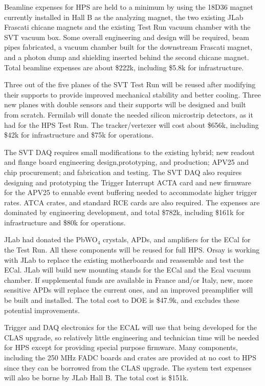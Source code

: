 Beamline expenses for HPS are held to a minimum by using the 18D36 magnet currently installed in Hall B as the analyzing magnet, the 
two existing JLab Frascati chicane magnets and the existing Test Run vacuum chamber with the SVT vacuum box.  Some overall engineering and design will be 
required, beam pipes fabricated, a vacuum chamber built for the downstream 
Frascati magnet, and a photon dump and shielding inserted behind the second chicane magnet. Total beamline expenses are about \$222k, including \$5.8k for infrastructure.

Three out of the five planes of the SVT Test Run will be reused after modifying their supports to provide improved 
mechanical stability and better cooling. Three new planes with double sensors and their supports will be designed and built from 
scratch. Fermilab will donate the needed silicon microstrip detectors, as it had for the HPS Test Run. The tracker/vertexer  will cost about \$656k, including \$42k for 
infrastructure and \$75k for operations.

The SVT DAQ requires small modifications to the  existing hybrid; new readout and flange board engineering design,prototyping, and 
production; 
APV25 and chip procurement; and  fabrication and testing. The SVT DAQ also requires designing and prototyping the Trigger Interrupt 
ACTA card and new firmware for the APV25 to ennable event buffering needed to accommodate higher trigger rates. ATCA crates, and standard 
RCE cards are also required. The expenses are dominated by engineering development, and total \$782k, including \$161k for infrastructure and \$80k for operations.  

JLab had donated the PbWO$_4$ crystals, APDs, and amplifiers for the ECal for the Test Run. All these components will be reused for full HPS. 
Orsay is working with JLab to replace the existing motherboards and reassemble and test the ECal. JLab will build new mounting stands for 
the ECal and the Ecal vacuum chamber. If supplemental funds are available in France and/or Italy, new, more sensitive APDs will replace 
the current ones, and an improved preamplifier will be built and installed. The total cost to DOE is \$47.9k, and excludes these potential improvements. 

Trigger and DAQ electronics for the ECAL will use that being developed for 
the CLAS upgrade, so relatively little engineering and technician time will be needed for HPS except 
for providing special purpose firmware. Many components, including the 250 MHz FADC boards and crates are provided at no cost to HPS  
since they can be borrowed from the CLAS upgrade. The system test expenses will also be borne by JLab Hall B. The total cost 
is \$151k. 

